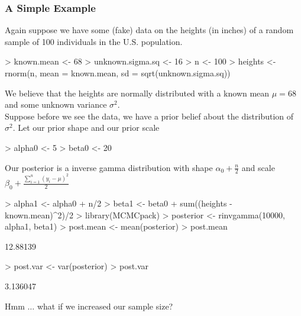\documentclass[handout]{beamer}
\begin{document}
\begin{frame}[fragile]
\frametitle{A Simple Example}
\pause
Again suppose we have some (fake) data on the heights (in inches) of a
random sample of 100 individuals in the U.S. population.
\pause
\medskip
\tiny
\begin{Schunk}
\begin{Sinput}
> known.mean <- 68
> unknown.sigma.sq <- 16
> n <- 100
> heights <- rnorm(n, mean = known.mean, sd = sqrt(unknown.sigma.sq))
\end{Sinput}
\end{Schunk}
\normalsize
\pause
\bigskip
 We believe that the heights are normally distributed with a known
mean $\mu = 68$ and some unknown variance $\sigma^2$.\\
\bigskip
\pause
Suppose before we see the data, we have a prior belief about the
distribution of $\sigma^2$.  Let our prior shape  and
our prior scale 
\medskip
\pause
\tiny
\begin{Schunk}
\begin{Sinput}
> alpha0 <- 5
> beta0 <- 20
\end{Sinput}
\end{Schunk}
\end{frame}

\begin{frame}[fragile]
Our posterior is a inverse gamma distribution with shape $\alpha_0 +
\frac{n}{2}$ and scale $\beta_0 + \frac{\sum_{i=1}^n (y_i-\mu)^2}{2}$
\medskip
\pause
\tiny
\begin{Schunk}
\begin{Sinput}
> alpha1 <- alpha0 + n/2
> beta1 <- beta0 + sum((heights - known.mean)^2)/2
> library(MCMCpack)
> posterior <- rinvgamma(10000, alpha1, beta1)
> post.mean <- mean(posterior)
> post.mean
\end{Sinput}
\begin{Soutput}
[1] 12.88139
\end{Soutput}
\begin{Sinput}
> post.var <- var(posterior)
> post.var
\end{Sinput}
\begin{Soutput}
[1] 3.136047
\end{Soutput}
\end{Schunk}
\normalsize
\pause
Hmm $\dots$ what if we increased our sample size?
\end{frame}
\end{document}
